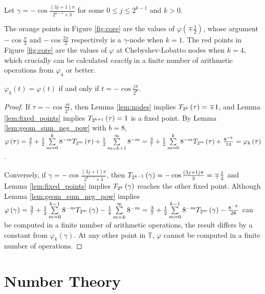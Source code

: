 \begin{definition}
  \label{def:gamma_nodes}
  Let $\gamma = -\cos\frac{\left(3j + 1\right)\pi}{2^{k - 1} \times 3}$ for some $0 \leq j \leq 2^{k - 1}$ and $k > 0$.
\end{definition}

The orange points in Figure \ref{fig:core} are the values of $\varphi\left(\mp \frac{1}{2}\right)$, whose argument $-\cos\frac{\pi}{3}$ and $-\cos\frac{2\pi}{3}$ respectively is a $\gamma$-node when $k = 1$. The red points in Figure \ref{fig:core} are the values of $\varphi$ at Chebyshev-Lobatto nodes when $k = 4$, which crucially can be calculated \emph{exactly} in a finite number of arithmetic operations from $\varphi_4$ or better.

\begin{lemma}
  \label{lem:magic}
  $\varphi_k\left(t\right) = \varphi\left(t\right)$ if and only if $t = -\cos\frac{j\pi}{2^k}$.
\end{lemma}
\begin{proof}
  If $\tau = -\cos\frac{j\pi}{2^k}$, then Lemma \ref{lem:nodes} implies $\TT[\tau]{k} = \mp 1$, and Lemma \ref{lem:fixed_points} implies $\TT[\tau]{k + 1} = 1$ is a fixed point. By Lemma \ref{lem:geom_sum_neg_pow} with $b = 8$, $\varphi\left(\tau\right) = \threesevenths + \halfsum{0}{k}{\tau} + \frac{1}{2}\sum\limits_{m = k + 1}^\infty 8^{-m} = \threesevenths + \halfsum{0}{k}{\tau} + \offset = \varphi_k\left(\tau\right)$.
  
  Conversely, if $\gamma = -\cos\frac{\left(3j + 1\right)\pi}{2^{k - 1} \times 3}$, then $\TT[\gamma]{k - 1} = -\cos \frac{\left(3j + 1\right) \pi}{3} = \mp \frac{1}{2}$ and Lemma \ref{lem:fixed_points} implies $\TT[\gamma]{k}$ reaches the other fixed point. Although Lemma \ref{lem:geom_sum_neg_pow} implies $\varphi\left(\gamma\right) = \threesevenths + \halfsum{0}{k - 1}{\gamma} - \frac{1}{4}\sum\limits_{m = k}^\infty 8^{-m} = \threesevenths + \halfsum{0}{k - 1}{\gamma} - \frac{8^{-k}}{28}$ can be computed in a finite number of arithmetic operations, the result differs by a constant from $\varphi_k\left(\gamma\right)$. At any other point in $\mathbb{T}$, $\varphi$ cannot be computed in a finite number of operations.
\end{proof}

\section{Number Theory}\label{sec:NumberTheory}

